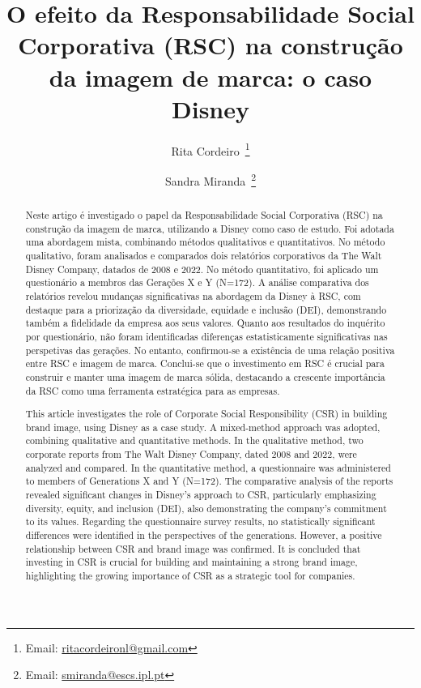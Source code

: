 \documentclass[portuguese]{textolivre}
\title{O efeito da Responsabilidade Social Corporativa (RSC) na construção da imagem de marca: o caso Disney}
\author[1]{Rita Cordeiro~\orcid{0000-0001-8713-6370}\thanks{Email: \href{mailto:ritacordeironl@gmail.com}{ritacordeironl@gmail.com}}}
\author[2]{Sandra Miranda~\orcid{0000-0002-5544-5942}\thanks{Email: \href{mailto:smiranda@escs.ipl.pt}{smiranda@escs.ipl.pt}}}
\affil[1]{Escola Superior de Comunicação Social, IPL, Lisboa, Portugal.}
\affil[2]{Escola Superior de Comunicação Social, IPL, LIACOM, Lisboa, Portugal.}
\begin{document}
\maketitle
\begin{polyabstract}
\begin{abstract}
Neste artigo é investigado o papel da Responsabilidade Social Corporativa (RSC) na construção da imagem de marca, utilizando a Disney como caso de estudo. Foi adotada uma abordagem mista, combinando métodos qualitativos e quantitativos. No método qualitativo, foram analisados e comparados dois relatórios corporativos da The Walt Disney Company, datados de 2008 e 2022. No método quantitativo, foi aplicado um questionário a membros das Gerações X e Y (N=172). A análise comparativa dos relatórios revelou mudanças significativas na abordagem da Disney à RSC, com destaque para a priorização da diversidade, equidade e inclusão (DEI), demonstrando também a fidelidade da empresa aos seus valores. Quanto aos resultados do inquérito por questionário, não foram identificadas diferenças estatisticamente significativas nas perspetivas das gerações. No entanto, confirmou-se a existência de uma relação positiva entre RSC e imagem de marca. Conclui-se que o investimento em RSC é crucial para construir e manter uma imagem de marca sólida, destacando a crescente importância da RSC como uma ferramenta estratégica para as empresas.

\end{abstract}

\begin{english}
\begin{abstract}
This article investigates the role of Corporate Social Responsibility (CSR) in building brand image, using Disney as a case study. A mixed-method approach was adopted, combining qualitative and quantitative methods. In the qualitative method, two corporate reports from The Walt Disney Company, dated 2008 and 2022, were analyzed and compared. In the quantitative method, a questionnaire was administered to members of Generations X and Y (N=172). The comparative analysis of the reports revealed significant changes in Disney's approach to CSR, particularly emphasizing diversity, equity, and inclusion (DEI), also demonstrating the company's commitment to its values. Regarding the questionnaire survey results, no statistically significant differences were identified in the perspectives of the generations. However, a positive relationship between CSR and brand image was confirmed. It is concluded that investing in CSR is crucial for building and maintaining a strong brand image, highlighting the growing importance of CSR as a strategic tool for companies.

\end{abstract}
\end{english}
\end{polyabstract}
\end{document}
